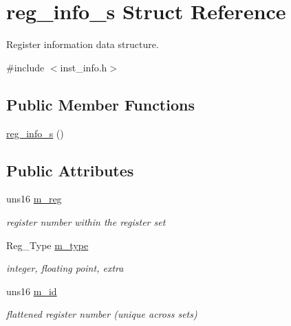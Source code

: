 \hypertarget{structreg__info__s}{
\section{reg\_\-info\_\-s Struct Reference}
\label{structreg__info__s}
}


Register information data structure.  




{\ttfamily \#include $<$inst\_\-info.h$>$}

\subsection*{Public Member Functions}
\begin{DoxyCompactItemize}
\item 
\hyperlink{structreg__info__s_a868de813f36a320d6a67dfba5548b90e}{reg\_\-info\_\-s} ()
\end{DoxyCompactItemize}
\subsection*{Public Attributes}
\begin{DoxyCompactItemize}
\item 
\hypertarget{structreg__info__s_aed3b44e06ae0390ed062366b04b75c81}{
uns16 \hyperlink{structreg__info__s_aed3b44e06ae0390ed062366b04b75c81}{m\_\-reg}}
\label{structreg__info__s_aed3b44e06ae0390ed062366b04b75c81}

\begin{DoxyCompactList}\small\item\em register number within the register set \item\end{DoxyCompactList}\item 
\hypertarget{structreg__info__s_a86340490bcb855cb8da9c691a382d478}{
Reg\_\-Type \hyperlink{structreg__info__s_a86340490bcb855cb8da9c691a382d478}{m\_\-type}}
\label{structreg__info__s_a86340490bcb855cb8da9c691a382d478}

\begin{DoxyCompactList}\small\item\em integer, floating point, extra \item\end{DoxyCompactList}\item 
\hypertarget{structreg__info__s_a8b1cdcb766e8417c38d8d2e125d63eb1}{
uns16 \hyperlink{structreg__info__s_a8b1cdcb766e8417c38d8d2e125d63eb1}{m\_\-id}}
\label{structreg__info__s_a8b1cdcb766e8417c38d8d2e125d63eb1}

\begin{DoxyCompactList}\small\item\em flattened register number (unique across sets) \item\end{DoxyCompactList}\end{DoxyCompactItemize}


